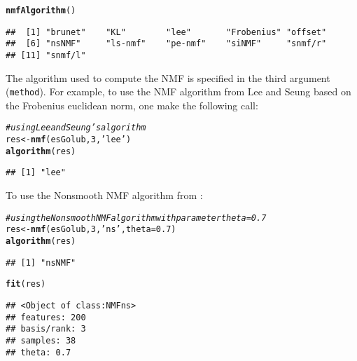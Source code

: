 \documentclass[a4paper]{article}\usepackage[]{graphicx}\usepackage[]{color}
\makeatletter
\newcommand{\hlnum}[1]{\textcolor[rgb]{0.686,0.059,0.569}{#1}}%
\newcommand{\hlstr}[1]{\textcolor[rgb]{0.192,0.494,0.8}{#1}}%
\newcommand{\hlcom}[1]{\textcolor[rgb]{0.678,0.584,0.686}{\textit{#1}}}%
\newcommand{\hlstd}[1]{\textcolor[rgb]{0.345,0.345,0.345}{#1}}%
\newcommand{\hlkwb}[1]{\textcolor[rgb]{0.69,0.353,0.396}{#1}}%
\newcommand{\hlkwc}[1]{\textcolor[rgb]{0.333,0.667,0.333}{#1}}%
\newcommand{\hlkwd}[1]{\textcolor[rgb]{0.737,0.353,0.396}{\textbf{#1}}}%
\newenvironment{kframe}{%
 \def\at@end@of@kframe{}%
 \ifinner\ifhmode%
  \def\at@end@of@kframe{\end{minipage}}%
  \begin{minipage}{\columnwidth}%
 \fi\fi%
 \def\FrameCommand##1{\hskip\@totalleftmargin \hskip-\fboxsep
 \colorbox{shadecolor}{##1}\hskip-\fboxsep
     \hskip-\linewidth \hskip-\@totalleftmargin \hskip\columnwidth}%
 \MakeFramed {\advance\hsize-\width
   \@totalleftmargin\z@ \linewidth\hsize
   \@setminipage}}%
 {\par\unskip\endMakeFramed%
 \at@end@of@kframe}
\newenvironment{knitrout}{}{} %
\let\code=\texttt
\renewcommand{\cite}[1]{\parencite{#1}}
\makeatother
\begin{document}
\begin{knitrout}
\color{fgcolor}\begin{kframe}
\begin{alltt}
\hlkwd{nmfAlgorithm}\hlstd{()}
\end{alltt}
\begin{verbatim}
##  [1] "brunet"    "KL"        "lee"       "Frobenius" "offset"   
##  [6] "nsNMF"     "ls-nmf"    "pe-nmf"    "siNMF"     "snmf/r"   
## [11] "snmf/l"
\end{verbatim}
\end{kframe}
\end{knitrout}


The algorithm used to compute the NMF is specified in the third argument (\code{method}). 
For example, to use the NMF algorithm from Lee and Seung \cite{Lee2001} based on
the Frobenius euclidean norm, one make the following call:
\begin{knitrout}
\color{fgcolor}\begin{kframe}
\begin{alltt}
\hlcom{# using Lee and Seung's algorithm}
\hlstd{res} \hlkwb{<-} \hlkwd{nmf}\hlstd{(esGolub,} \hlnum{3}\hlstd{,} \hlstr{'lee'}\hlstd{)}
\hlkwd{algorithm}\hlstd{(res)}
\end{alltt}
\begin{verbatim}
## [1] "lee"
\end{verbatim}
\end{kframe}
\end{knitrout}

To use the Nonsmooth NMF algorithm from \cite{Pascual-Montano2006}: 
\begin{knitrout}
\color{fgcolor}\begin{kframe}
\begin{alltt}
\hlcom{# using the Nonsmooth NMF algorithm with parameter theta=0.7}
\hlstd{res} \hlkwb{<-} \hlkwd{nmf}\hlstd{(esGolub,} \hlnum{3}\hlstd{,} \hlstr{'ns'}\hlstd{,} \hlkwc{theta}\hlstd{=}\hlnum{0.7}\hlstd{)}
\hlkwd{algorithm}\hlstd{(res)}
\end{alltt}
\begin{verbatim}
## [1] "nsNMF"
\end{verbatim}
\begin{alltt}
\hlkwd{fit}\hlstd{(res)}
\end{alltt}
\begin{verbatim}
## <Object of class:NMFns>
## features: 200 
## basis/rank: 3 
## samples: 38 
## theta: 0.7
\end{verbatim}
\end{kframe}
\end{knitrout}
\end{document}
